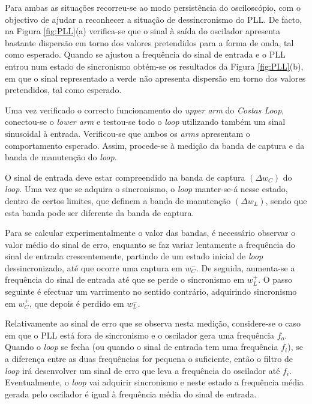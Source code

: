 \documentclass[11pt]{article}
\numberwithin{equation}{section}
\begin{document}
Para ambas as situações recorreu-se ao modo persistência do osciloscópio, com o objectivo de ajudar a reconhecer a situação de dessincronismo do PLL. De facto, na Figura \ref{fig:PLL}(a) verifica-se que o sinal à saída do oscilador apresenta bastante dispersão em torno dos valores pretendidos para a forma de onda, tal como esperado. Quando se ajustou a frequência do sinal de entrada e o PLL entrou num estado de sincronismo obtém-se os resultados da Figura \ref{fig:PLL}(b), em que o sinal representado a verde não apresenta dispersão em torno dos valores pretendidos, tal como esperado.

Uma vez verificado o correcto funcionamento do \textit{upper arm} do \textit{Costas Loop}, conectou-se o \textit{lower arm} e testou-se todo o \textit{loop} utilizando também um sinal sinusoidal à entrada. Verificou-se que ambos os \textit{arms} apresentam o comportamento esperado. Assim, procede-se à medição da banda de captura e da banda de manutenção do \textit{loop}.

O sinal de entrada deve estar compreendido na banda de captura $\left(\Delta w_{C}\right)$ do \textit{loop}. Uma vez que se adquira o sincronismo, o \textit{loop} manter-se-á nesse estado, dentro de certos limites, que definem a banda de manutenção $\left(\Delta w_{L}\right)$, sendo que esta banda pode ser diferente da banda de captura. 

Para se calcular experimentalmente o valor das bandas, é necessário observar o valor médio do sinal de erro, enquanto se faz variar lentamente a frequência do sinal de entrada crescentemente, partindo de um estado inicial de \textit{loop} dessincronizado, até que ocorre uma captura em $w_{C}^{-}$. De seguida, aumenta-se a frequência do sinal de entrada até que se perde o sincronismo em $w_{L}^{+}$. O passo seguinte é efectuar um varrimento no sentido contrário, adquirindo sincronismo em $w_{C}^{+}$, que depois é perdido em $w_{L}^{-}$.

Relativamente ao sinal de erro que se observa nesta medição, considere-se o caso em que o PLL está fora de sincronismo e o oscilador gera uma frequência $f_o$. Quando o \textit{loop} se fecha (ou quando o sinal de entrada tem uma frequência $f_i$), se a diferença entre as duas frequências for pequena o suficiente, então o filtro de  \textit{loop} irá desenvolver um sinal de erro que leva a frequência do oscilador até $f_i$. Eventualmente, o \textit{loop} vai adquirir sincronismo e neste estado a frequência média gerada pelo oscilador é igual à frequência média do sinal de entrada.
\end{document}

